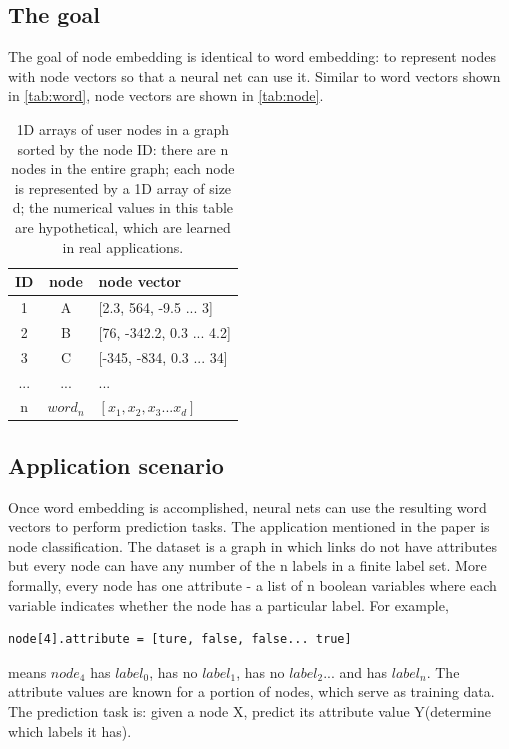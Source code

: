 \documentclass{article}
\begin{document}
\subsection{The goal}

The goal of node embedding is identical to word embedding: to represent nodes with node vectors so that a neural net can use it. Similar to word vectors shown in \autoref{tab:word}, node vectors are shown in \autoref{tab:node}.

\begin{table}[h]
	\centering
	\begin{tabularx}{0.5\textwidth}{|c|c|X|} \hline
		ID & node & node vector \\ \hline
		1 & A & [2.3, 564, -9.5 ... 3] \\ \hline
		2 & B & [76, -342.2, 0.3 ... 4.2] \\ \hline
		3 & C & [-345, -834, 0.3 ... 34] \\ \hline
		... & ... & ... \\ \hline
		n & $ word_n $ & $ [x_1, x_2, x_3 ... x_d] $ \\ \hline
	\end{tabularx}
	\caption{1D arrays of user nodes in a graph sorted by the node ID: there are n nodes in the entire graph; each node is represented by a 1D array of size d; the numerical values in this table are hypothetical, which are learned in real applications.}
	\label{tab:node}
\end{table}

\subsection{Application scenario}

Once word embedding is accomplished, neural nets can use the resulting word vectors to perform prediction tasks. The application mentioned in the paper is node classification. The dataset is a graph in which links do not have attributes but every node can have any number of the n labels in a finite label set. More formally, every node has one attribute - a list of n boolean variables where each variable indicates whether the node has a particular label. For example,
\begin{lstlisting}
node[4].attribute = [ture, false, false... true]
\end{lstlisting}
means $ node_4 $ has $ label_0 $, has no $ label_1 $, has no $ label_2 $... and has $ label_n $. The attribute values are known for a portion of nodes, which serve as training data. The prediction task is: given a node X, predict its attribute value Y(determine which labels it has).
\end{document}
